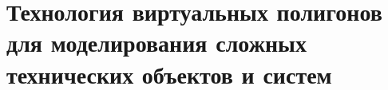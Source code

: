 \chapter{Технология виртуальных полигонов для моделирования сложных технических объектов и систем}

